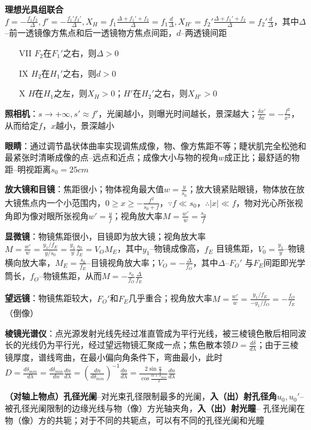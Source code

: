 \documentclass[10pt,a4paper]{article}
\begin{document}
\textbf{理想光具组联合}$f=-\frac{f_1f_2}{\Delta},f'=-\frac{f_1'f_2'}{\Delta},X_H=f_1\frac{\Delta+f_1'+f_2}{\Delta}=f_1\frac{d}{\Delta},X_{H'}=f_2'\frac{\Delta+f_1'+f_2}{\Delta}=f_2'\frac{d}{\Delta}$，其中$\Delta$--前一透镜像方焦点和后一透镜物方焦点间距，$d$--两透镜间距
\begin{itemize}
  \item[VII] $F_2$在$F_1'$之右，则$\Delta>0$
  \item[IX] $H_2$在$H_1'$之右，则$d>0$
  \item[X] $H$在$H_1$之左，则$X_H>0$；$H'$在$H_2'$之右，则$X_{H'}>0$
\end{itemize}

\textbf{照相机}：$s\to+\infty,s'\approx f'$，光阑越小，则曝光时间越长，景深越大；$\frac{\delta x'}{\delta x}=-\frac{f^2}{x^2}$，从而给定$f$，$x$越小，景深越小

\textbf{眼睛}：通过调节晶状体曲率实现调焦成像，物、像方焦距不等；睫状肌完全松弛和最紧张时清晰成像的点--远点和近点；成像大小与物的视角$w$成正比；最舒适的物距--明视距离$s_0=25cm$

\textbf{放大镜和目镜}：焦距很小；物体视角最大值$w=\frac{y}{s_0}$；放大镜紧贴眼镜，物体放在放大镜焦点内一个小范围内，$0\geq x\geq-\frac{f^2}{s_0+f}$，$\because f\ll s_0$，$\therefore|x|\ll f$，物对光心所张视角即为像对眼所张视角$w'=\frac{y}{f}$；视角放大率$M=\frac{w'}{w}=\frac{s_0}{f}$

\textbf{显微镜}：物镜焦距很小，目镜即为放大镜；视角放大率$M=\frac{w'}{w}=\frac{y_1/f_E}{y/s_0}=\frac{y_1}{y}\frac{s_0}{f_E}=V_OM_E$，其中$y_1$--物镜成像高，$f_E$ 目镜焦距，$V_0=\frac{y_1}{y}$--物镜横向放大率，$M_E=\frac{s_0}{f_E}$--目镜视角放大率；$V_O=-\frac{\Delta}{f_O}$，其中$\Delta$--$F_O'$ 与$F_E$间距即光学筒长，$f_O$--物镜焦距，从而$M=-\frac{s_0}{f_O}\frac{\Delta}{f_E}$

\textbf{望远镜}：物镜焦距较大，$F_O'$和$F_E$几乎重合；视角放大率$M=\frac{w'}{w}=\frac{y_1/f_E}{-y_1/f_O}=-\frac{f_O}{f_E}$（倒像）

\textbf{棱镜光谱仪}：点光源发射光线先经过准直管成为平行光线，被三棱镜色散后相同波长的光线仍为平行光，经过望远物镜汇聚成一点；焦色散本领$D=\frac{d\delta}{d\lambda}$；由于三棱镜厚度，谱线弯曲，在最小偏向角条件下，弯曲最小，此时$D=\frac{d\delta_{min}}{d\lambda}=\frac{d\delta_{min}}{dn}\frac{dn}{d\lambda}=(\frac{dn}{d\delta_{min}})^{-1}\frac{dn}{d\lambda}=\frac{2\sin\frac{\alpha}{2}}{\cos\frac{\alpha+\delta_{min}}{2}}\frac{dn}{d\lambda}$

\textbf{（对轴上物点）孔径光阑}--对光束孔径限制最多的光阑，\textbf{入（出）射孔径角}$u_0,u_0'$--被孔径光阑限制的边缘光线与物（像）方光轴夹角，\textbf{入（出）射光瞳}-- 孔径光阑在物（像）方的共轭；对于不同的共轭点，可以有不同的孔径光阑和光瞳
\end{document}
